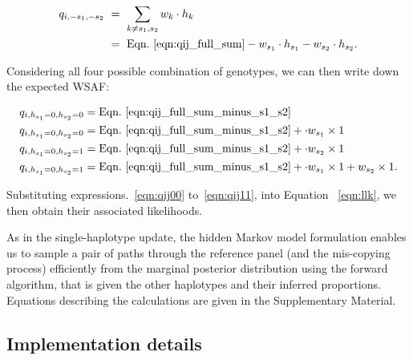 \documentclass{bioinfo}
\begin{document}
\begin{equation}
\begin{split}
q_{i,-s_1, -s_2} & ~ = ~ \sum_{k\neq s_1,s_2} w_k \cdot h_k \\
                 & ~ = ~ \textrm{Eqn.~\eqref{eqn:qij_full_sum}} - w_{s_1} \cdot h_{s_1} - w_{s_2} \cdot h_{s_2}.
\label{eqn:qij_full_sum_minus_s1_s2}
\end{split}
\end{equation}

\noindent Considering all four possible combination of genotypes, we can then write down the expected WSAF:

\begin{align}
q_{i,h_{s_1}=0,h_{s_2}=0} & = \textrm{Eqn.~\eqref{eqn:qij_full_sum_minus_s1_s2}} \label{eqn:qij00}\\
q_{i,h_{s_1}=0,h_{s_2}=0} & = \textrm{Eqn.~\eqref{eqn:qij_full_sum_minus_s1_s2}} + \cdot w_{s_1} \times 1 \label{eqn:qij10}\\
q_{i,h_{s_1}=0,h_{s_2}=1} & = \textrm{Eqn.~\eqref{eqn:qij_full_sum_minus_s1_s2}} + \cdot w_{s_2} \times 1 \label{eqn:qij01}\\
q_{i,h_{s_1}=0,h_{s_2}=1} & = \textrm{Eqn.~\eqref{eqn:qij_full_sum_minus_s1_s2}} + \cdot w_{s_1} \times 1 + w_{s_2} \times 1 \label{eqn:qij11}.
\end{align}

\noindent Substituting expressions.~\eqref{eqn:qij00} to~\eqref{eqn:qij11}, into Equation ~\eqref{eqn:llk}, we then obtain their associated likelihoods.

As in the single-haplotype update, the hidden Markov model formulation enables us to sample a pair of paths through the reference panel (and the mis-copying process) efficiently from the marginal posterior distribution using the forward algorithm, that is given the other haplotypes and their inferred proportions.  Equations describing the calculations are given in the Supplementary Material.


\subsection{Implementation details}
\end{document}
